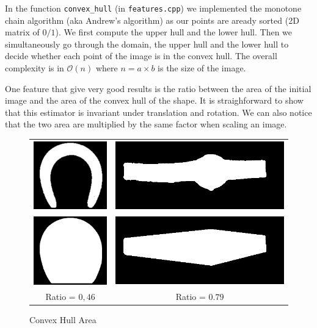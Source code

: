 \documentclass[a4paper, 11pt]{article}
\begin{document}
\medskip In the function \verb|convex_hull| (in \verb|features.cpp|) we implemented the monotone chain algorithm (aka Andrew's algorithm) as our points are aready sorted (2D matrix of $0/1$). We first compute the upper hull and the lower hull.
Then we simultaneously go through the domain, the upper hull and the lower hull to decide whether each point of the image is in the convex hull. The overall complexity is in $\mathcal O(n)$ where $n=a \times b$ is the size of the image.

\medskip One feature that give very good results is the ratio between the area of the initial image and the area of the convex hull of the shape. It is straighforward to show that this estimator is invariant under translation and rotation. We can also notice that the two area are multiplied by the same factor when scaling an image.

\begin{figure}[h!]
\centering
\begin{tabular}{c@{~}c}
\includegraphics[height=3cm]{horseshoe.png} &
\includegraphics[height=3cm]{watch.png} \\
\includegraphics[height=3cm]{horseshoe-convex.png} &
\includegraphics[height=3cm]{watch-convex.png} \\
Ratio = $0,46$ & Ratio = $0.79$
\end{tabular}
\caption{Convex Hull Area}
\end{figure}
\end{document}

